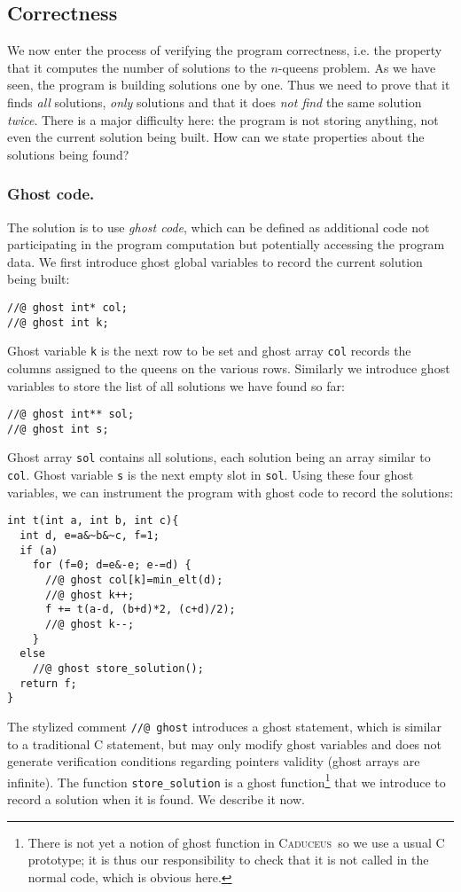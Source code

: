 \documentclass[a4paper]{llncs}
\newcommand{\caduceus}{\textsc{Caduceus}}
\begin{document}
\subsection{Correctness}\label{correctness}

We now enter the process of verifying the program correctness,
i.e. the property that it computes the number of solutions to the
$n$-queens problem. As
we have seen, the program is building solutions one by one. Thus
we need to prove that it finds \emph{all} solutions, \emph{only}
solutions and that it does \emph{not find} the same
solution \emph{twice}. 
There is a major difficulty here: the program is not storing
anything, not even the current solution being built. How can we
state properties about the solutions being found? 

\subsubsection{Ghost code.} The solution is to
use \emph{ghost code}, which can be defined as additional code not
participating in the program computation but potentially accessing the
program data. We first introduce ghost global variables to record the 
current solution being built:
\begin{verbatim}
//@ ghost int* col;
//@ ghost int k;
\end{verbatim}
Ghost variable \texttt{k} is the next row to be set and ghost
array \texttt{col} records the columns assigned to the queens on the
various rows. Similarly we introduce ghost variables to store the list of
all solutions we have found so far:
\begin{verbatim}
//@ ghost int** sol;
//@ ghost int s;
\end{verbatim}
Ghost array \texttt{sol} contains all solutions, each
solution being an array similar to \texttt{col}.
Ghost variable \texttt{s} is the next empty slot in \texttt{sol}. 
Using these four ghost variables, we can instrument the program with
ghost code to record the solutions:
\begin{verbatim}
int t(int a, int b, int c){
  int d, e=a&~b&~c, f=1;
  if (a)
    for (f=0; d=e&-e; e-=d) {
      //@ ghost col[k]=min_elt(d);
      //@ ghost k++;
      f += t(a-d, (b+d)*2, (c+d)/2);
      //@ ghost k--;
    }
  else 
    //@ ghost store_solution();
  return f;
}
\end{verbatim}
The stylized comment \verb!//@ ghost! introduces a ghost statement,
which is similar to a traditional C statement, but may only modify
ghost variables and does not generate verification conditions
regarding pointers validity (ghost arrays are infinite).
The function \texttt{store\_solution} is a ghost
function\footnote{There is not yet a notion of ghost function in
  \caduceus\ so we use a usual C prototype; it is thus our
  responsibility to check that it is not called in the normal code,
  which is obvious here.} that we introduce to record a solution when
it is found. We describe it now.
\end{document}
